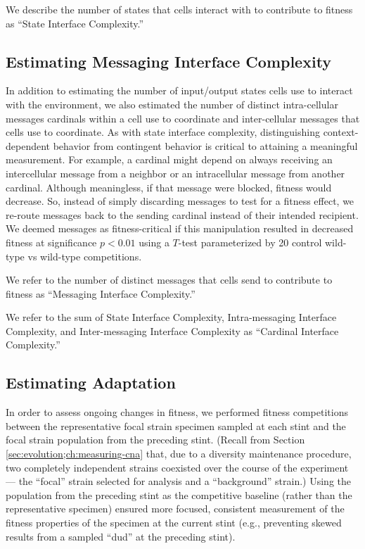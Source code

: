 We describe the number of states that cells interact with to contribute to fitness as ``State Interface Complexity.''

\subsection{Estimating Messaging Interface Complexity}
\label{sec:estimating-messaging-interface-complexity;ch:measuring-cna}

In addition to estimating the number of input/output states cells use to interact with the environment, we also estimated the number of distinct intra-cellular messages cardinals within a cell use to coordinate and inter-cellular messages that cells use to coordinate.
As with state interface complexity, distinguishing context-dependent behavior from contingent behavior is critical to attaining a meaningful measurement.
For example, a cardinal might depend on always receiving an intercellular message from a neighbor or an intracellular message from another cardinal.
Although meaningless, if that message were blocked, fitness would decrease.
So, instead of simply discarding messages to test for a fitness effect, we re-route messages back to the sending cardinal instead of their intended recipient.
We deemed messages as fitness-critical if this manipulation resulted in decreased fitness at significance $p < 0.01$ using a $T$-test parameterized by 20 control wild-type vs wild-type competitions.

We refer to the number of distinct messages that cells send to contribute to fitness as ``Messaging Interface Complexity.''

We refer to the sum of State Interface Complexity, Intra-messaging Interface Complexity, and Inter-messaging Interface Complexity as ``Cardinal Interface Complexity.''

\subsection{Estimating Adaptation}
\label{sec:measuring-adaptation;ch:measuring-cna}

In order to assess ongoing changes in fitness, we performed fitness competitions between the representative focal strain specimen sampled at each stint and the focal strain population from the preceding stint.
(Recall from Section \ref{sec:evolution;ch:measuring-cna} that, due to a diversity maintenance procedure, two completely independent strains coexisted over the course of the experiment --- the ``focal'' strain selected for analysis and a ``background'' strain.)
Using the population from the preceding stint as the competitive baseline (rather than the representative specimen) ensured more focused, consistent measurement of the fitness properties of the specimen at the current stint (e.g., preventing skewed results from a sampled ``dud'' at the preceding stint).

